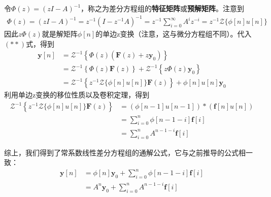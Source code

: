 令$\Phi(z)=(zI - A)^{-1}$，称之为差分方程组的\textbf{特征矩阵}或\textbf{预解矩阵}。注意到\begin{align*}
    \Phi(z)=(zI - A)^{-1} = z^{-1} (I - z^{-1} A)^{-1} = z^{-1} \sum_{i=0}^{\infty}A^i z^{-i} = z^{-1}\mathcal{Z}\{\phi[n]u[n]\}
\end{align*}
因此$z\Phi(z)$就是解矩阵$\phi[n]$的单边z变换（注意，这与微分方程组不同）。代入$(**)$式，得到
\begin{align*}
    \mathbf{y}[n] & = \mathcal{Z}^{-1} \left\{\Phi(z)(\mathbf{F}(z) + z\mathbf{y}_0)\right\}\\
    &= \mathcal{Z}^{-1} \left\{\Phi(z) \mathbf{F}(z)\right\} + \mathcal{Z}^{-1} \left\{z\Phi(z)\mathbf{y}_0\right\}\\
    & = \mathcal{Z}^{-1} \left\{z^{-1}\mathcal{Z}\{\phi[n]u[n]\} \mathbf{F}(z)\right\} +\phi[n]u[n]\mathbf{y}_0
\end{align*}
利用单边z变换的移位性质以及卷积定理，得到\begin{align*}
    \mathcal{Z}^{-1} \left\{z^{-1}\mathcal{Z}\{\phi[n]u[n]\} \mathbf{F}(z)\right\}&=(\phi[n-1]u[n-1]) * (\mathbf{f}[n]u[n])\\
    &=\sum_{i=0}^{n} \phi[n-1-i] \mathbf{f}[i]\\
    & = \sum_{i=0}^{n} A^{n-1-i} \mathbf{f}[i]
\end{align*}

综上，我们得到了常系数线性差分方程组的通解公式，它与之前推导的公式相一致：
\begin{align*}
    \mathbf{y}[n]& = \phi[n]\mathbf{y}_0 + \sum_{i=0}^{n} \phi[n-1-i]\mathbf{f}[i]\\
    & = A^n \mathbf{y}_0 + \sum_{i=0}^{n} A^{n-1-i} \mathbf{f}[i]
\end{align*}

